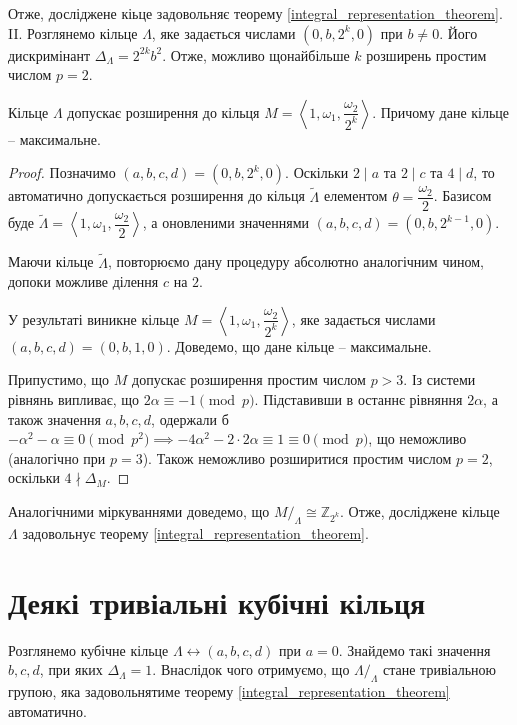 \documentclass{thesis}
\begin{document}
Отже, досліджене кіьце задовольняє теорему \ref{integral_representation_theorem}.
\bigskip \\

II. Розглянемо кільце $\Lambda$, яке задається числами $(0,b,2^k,0)$ при $b \neq 0$. Його дискримінант $\Delta_\Lambda = 2^{2k} b^2$. Отже, можливо щонайбільше $k$ розширень простим числом $p = 2$.

\begin{proposition}
Кільце $\Lambda$ допускає розширення до кільця $M = \left< 1,\omega_1,\dfrac{\omega_2}{2^k}\right>$. Причому дане кільце -- максимальне.
\end{proposition}

\begin{proof}
Позначимо $(a,b,c,d) = (0,b,2^k,0)$. Оскільки $2 \mid a$ та $2 \mid c$ та $4 \mid d$, то автоматично допускається розширення до кільця $\tilde{\Lambda}$ елементом $\theta = \dfrac{\omega_2}{2}$. Базисом буде $\tilde{\Lambda} = \left<1,\omega_1,\dfrac{\omega_2}{2}\right>$, а оновленими значеннями $(a,b,c,d) = (0,b,2^{k-1},0)$.

Маючи кільце $\tilde{\Lambda}$, повторюємо дану процедуру абсолютно аналогічним чином, допоки можливе ділення $c$ на $2$.

У результаті виникне кільце $M = \left<1,\omega_1,\dfrac{\omega_2}{2^k}\right>$, яке задається числами $(a,b,c,d) = (0,b,1,0)$. Доведемо, що дане кільце -- максимальне.

Припустимо, що $M$ допускає розширення простим числом $p > 3$. Із системи рівнянь випливає, що $2\alpha \equiv -1 \pmod p$. Підставивши в останнє рівняння $2\alpha$, а також значення $a,b,c,d$, одержали б $-\alpha^2-\alpha \equiv 0 \pmod {p^2} \implies -4 \alpha^2 - 2 \cdot 2\alpha \equiv 1 \equiv 0 \pmod p$, що неможливо (аналогічно при $p=3$). Також неможливо розширитися простим числом $p =2$, оскільки $4 \nmid \Delta_M$.
\end{proof}

Аналогічними міркуваннями доведемо, що $M/_\Lambda \cong \mathbb{Z}_{2^k}$. Отже, досліджене кільце $\Lambda$ задовольнує теорему \ref{integral_representation_theorem}.

\section{Деякі тривіальні кубічні кільця}
Розглянемо кубічне кільце $\Lambda \leftrightarrow (a,b,c,d)$ при $a = 0$. Знайдемо такі значення $b,c,d$, при яких $\Delta_\Lambda = 1$. Внаслідок чого отримуємо, що $\Lambda/_\Lambda$ стане тривіальною групою, яка задовольнятиме теорему \ref{integral_representation_theorem} автоматично.
\end{document}
